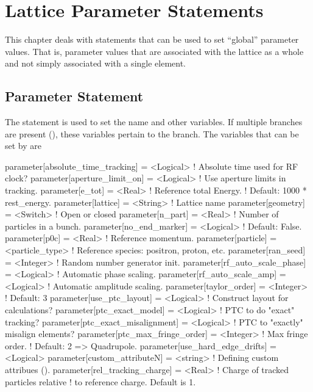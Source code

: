 \chapter{Lattice Parameter Statements}

This chapter deals with statements that can be used to set ``global''
parameter values. That is, parameter values that are associated with
the lattice as a whole and not simply associated with a single element.

\section{Parameter Statement}
\label{s:param}


The  statement is used to set the  name and
other variables. If multiple branches are present (), these
variables pertain to the  branch. The variables that can be
set by  are
\begin{example}
  parameter[absolute_time_tracking] = <Logical>  ! Absolute time used for RF clock?
  parameter[aperture_limit_on]      = <Logical>  ! Use aperture limits in tracking.
  parameter[e_tot]         = <Real>          ! Reference total Energy. 
                                             !      Default: 1000 * rest_energy.
  parameter[lattice]       = <String>        ! Lattice name 
  parameter[geometry]      = <Switch>        ! Open or closed
  parameter[n_part]        = <Real>          ! Number of particles in a bunch.
  parameter[no_end_marker] = <Logical>       ! Default: False.
  parameter[p0c]           = <Real>          ! Reference momentum.
  parameter[particle]      = <particle_type> ! Reference species: positron, proton, etc.
  parameter[ran_seed]      = <Integer>       ! Random number generator init.
  parameter[rf_auto_scale_phase]    = <Logical>  ! Automatic phase scaling.
  parameter[rf_auto_scale_amp]      = <Logical>  ! Automatic amplitude scaling.
  parameter[taylor_order]           = <Integer>  ! Default: 3
  parameter[use_ptc_layout]         = <Logical>  ! Construct layout for calculations?
  parameter[ptc_exact_model]        = <Logical>  ! PTC to do "exact" tracking?
  parameter[ptc_exact_misalignment] = <Logical>  ! PTC to "exactly" misalign elements?
  parameter[ptc_max_fringe_order]   = <Integer>  ! Max fringe order. 
                                                 !    Default: 2 => Quadrupole.
  parameter[use_hard_edge_drifts]   = <Logical>
  parameter[custom_attributeN]      = <string>   ! Defining custom attribues ().
  parameter[rel_tracking_charge]    = <Real>     ! Charge of tracked particles relative 
                                                 !   to reference charge. Default is 1.
\end{example}

